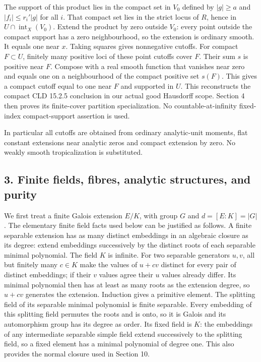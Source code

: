 \documentclass[
  11pt,
]{article}
\begin{document}
The support of this product lies in the compact set in \(V_0\) defined
by \(|g|\ge a\) and \(|f_i|\le r_i'|g|\) for all \(i\). That compact set
lies in the strict locus of \(R\), hence in
\(U\cap\operatorname{int}_X(V_0)\). Extend the product by zero outside
\(V_0\): every point outside the compact support has a zero
neighbourhood, so the extension is ordinary smooth. It equals one near
\(x\). Taking squares gives nonnegative cutoffs. For compact
\(F\subset U\), finitely many positive loci of these point cutoffs cover
\(F\). Their sum \(s\) is positive near \(F\). Compose with a real
smooth function that vanishes near zero and equals one on a
neighbourhood of the compact positive set \(s(F)\). This gives a compact
cutoff equal to one near \(F\) and supported in \(U\). This reconstructs
the compact CLD 15.2.5 conclusion in our actual good Hausdorff scope.
Section 4 then proves its finite-cover partition specialization. No
countable-at-infinity fixed-index compact-support assertion is used.

In particular all cutoffs are obtained from ordinary analytic-unit
moments, flat constant extensions near analytic zeros and compact
extension by zero. No weakly smooth tropicalization is substituted.

\subsection{3. Finite fields, fibres, analytic structures, and
purity}\label{finite-fields-fibres-analytic-structures-and-purity}

We first treat a finite Galois extension \(E/K\), with group \(G\) and
\(d=[E:K]=|G|\). The elementary finite field facts used below can be
justified as follows. A finite separable extension has as many distinct
embeddings in an algebraic closure as its degree: extend embeddings
successively by the distinct roots of each separable minimal polynomial.
The field \(K\) is infinite. For two separable generators \(u,v\), all
but finitely many \(c\in K\) make the values of \(u+cv\) distinct for
every pair of distinct embeddings; if their \(v\) values agree their
\(u\) values already differ. Its minimal polynomial then has at least as
many roots as the extension degree, so \(u+cv\) generates the extension.
Induction gives a primitive element. The splitting field of its
separable minimal polynomial is finite separable. Every embedding of
this splitting field permutes the roots and is onto, so it is Galois and
its automorphism group has its degree as order. Its fixed field is
\(K\): the embeddings of any intermediate separable simple field extend
successively to the splitting field, so a fixed element has a minimal
polynomial of degree one. This also provides the normal closure used in
Section 10.
\end{document}
